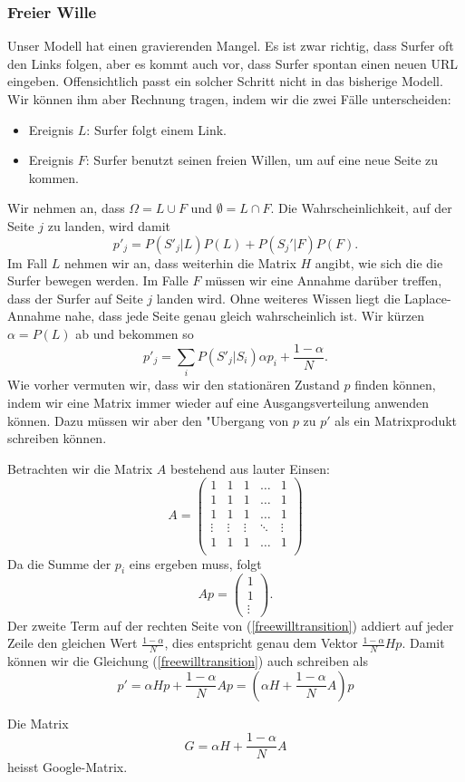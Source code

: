 \subsubsection{Freier Wille}
Unser Modell hat einen gravierenden Mangel.
Es ist zwar richtig, dass Surfer oft den
Links folgen, aber es kommt auch vor, dass
Surfer spontan einen neuen URL eingeben.
Offensichtlich passt ein solcher Schritt nicht in das bisherige Modell.
Wir können
ihm aber Rechnung tragen, indem wir die zwei Fälle unterscheiden:
\begin{itemize}
\item Ereignis $L$: Surfer folgt einem Link.
\item Ereignis $F$: Surfer benutzt seinen freien Willen,
um auf eine neue Seite zu kommen.
\end{itemize}
Wir nehmen an, dass $\Omega=L\cup F$ und $\emptyset=L\cap F$.
Die Wahrscheinlichkeit,
auf der Seite $j$ zu landen, wird damit
\[
p'_j=P(S'_j|L)P(L)+P(S_j'|F)P(F).
\]
Im Fall $L$ nehmen wir an, dass weiterhin die Matrix $H$ angibt, wie sich die
die Surfer bewegen werden.
Im Falle $F$ müssen wir eine Annahme darüber treffen,
dass der Surfer auf Seite $j$ landen wird.
Ohne weiteres Wissen liegt die Laplace-Annahme
nahe, dass jede Seite genau gleich wahrscheinlich ist.
Wir kürzen $\alpha=P(L)$ ab und bekommen so
\begin{equation}
p'_j=\sum_{i}P(S'_j|S_i)\alpha p_i+\frac{1-\alpha}N.
\label{freewilltransition}
\end{equation}
Wie vorher vermuten wir, dass wir den stationären Zustand $p$ finden können,
indem wir eine Matrix immer wieder auf eine Ausgangsverteilung anwenden können.
Dazu müssen wir aber den "Ubergang von $p$ zu $p'$ als ein Matrixprodukt
schreiben können.

Betrachten wir die Matrix $A$ bestehend aus lauter Einsen:
\[
A=\left(\begin{matrix}
1&1&1&\dots&1\\
1&1&1&\dots&1\\
1&1&1&\dots&1\\
\vdots&\vdots&\vdots&\ddots&\vdots\\
1&1&1&\dots&1\\
\end{matrix}\right)
\]
Da die Summe der $p_i$ eins ergeben muss, folgt
\[
Ap=\left(\begin{matrix}1\\1\\\vdots\end{matrix}\right).
\]
Der zweite Term auf der rechten Seite von (\ref{freewilltransition})
addiert auf jeder
Zeile den gleichen Wert $\frac{1-\alpha}{N}$, dies entspricht genau dem Vektor
$\frac{1-\alpha}{N}Hp$.
Damit können wir die Gleichung (\ref{freewilltransition}) auch schreiben als
\begin{equation}
p'=\alpha Hp + \frac{1-\alpha}{N}Ap = \left(\alpha H+\frac{1-\alpha}{N}A\right)p
\end{equation}
\begin{definition} Die Matrix
\[
G=
\alpha H+\frac{1-\alpha}{N}A
\]
heisst Google-Matrix.
\end{definition}

